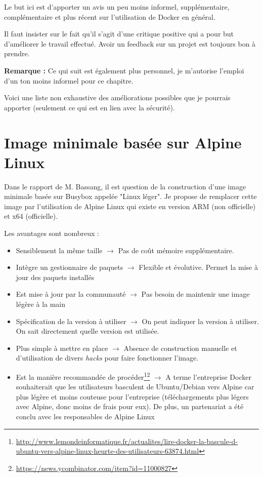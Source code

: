 \documentclass[11pt,a4paper,oneside]{report}
\begin{document}
Le but ici est d'apporter un avis un peu moins informel, supplémentaire, complémentaire et plus récent sur l'utilisation de Docker en général.

Il faut insister sur le fait qu'il s'agit d'une critique positive qui a pour but d'améliorer le travail effectué. Avoir un feedback sur un projet est toujours bon à prendre.

\textbf{Remarque :} Ce qui suit est également plus personnel, je m'autorise l'emploi d'un ton moins informel pour ce chapitre.

Voici une liste non exhaustive des améliorations possibles que je pourrais apporter (seulement ce qui est en lien avec la sécurité).

\section{Image minimale basée sur Alpine Linux}
Dans le rapport de M. Bassang, il est question de la construction d'une image minimale basée sur Busybox appelée "Linux léger". Je propose de remplacer cette image par l'utilisation de Alpine Linux qui existe en version ARM (non officielle) et x64 (officielle).

Les avantages sont nombreux :

\begin{itemize}
\item Sensiblement la même taille $\to$ Pas de coût mémoire supplémentaire.

\item Intègre un gestionnaire de paquets $\to$ Flexible et évolutive. Permet la mise à jour des paquets installés

\item Est mise à jour par la communauté $\to$ Pas besoin de maintenir une image légère à la main

\item Spécification de la version à utiliser $\to$ On peut indiquer la version à utiliser. On sait directement quelle version est utilisée.

\item Plus simple à mettre en place $\to$ Absence de construction manuelle et d'utilisation de divers \textit{hacks} pour faire fonctionner l'image.

\item Est la manière recommandée de procéder\footnote{\url{http://www.lemondeinformatique.fr/actualites/lire-docker-la-bascule-d-ubuntu-vers-alpine-linux-heurte-des-utilisateurs-63874.html}}\footnote{\url{https://news.ycombinator.com/item?id=11000827}} $\to$ A terme l'entreprise Docker souhaiterait que les utilisateurs basculent de Ubuntu/Debian vers Alpine car plus légère et moins couteuse pour l'entreprise (téléchargements plus légers avec Alpine, donc moins de frais pour eux). De plus, un partenariat a été conclu avec les responsables de Alpine Linux
  
\end{itemize}
\end{document}
